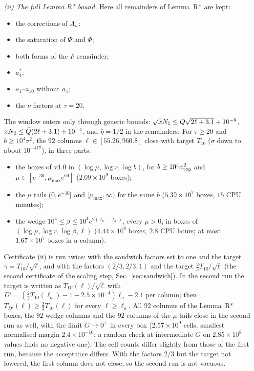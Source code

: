 \emph{(ii) The full Lemma R* bound.}
Here all remainders of Lemma~R* are kept:
\begin{itemize}
\item the corrections of $A_w$;
\item the saturation of $\Psi$ and $\Phi$;
\item both forms of the $F$ remainder;
\item $a_4^*$;
\item $a_1$--$a_{10}$ without $a_4$;
\item the $\nu$ factors at $\tau=20$.
\end{itemize}
The window enters only through generic bounds: $\sqrt xN_1\le\bar Q\sqrt{2\ell+3.1}+10^{-6}$, $xN_2\le\bar Q(2\ell+3.1)+10^{-4}$, and $\bar\eta=1/2$ in the remainders.
For $\tau\ge20$ and $b\ge10^4\sigma^2$, the $92$ columns $\ell\in[55.26,960.8]$ close with target $T_{10}$ ($\sigma$ down to about $10^{-417}$), in three parts:
\begin{itemize}
\item the boxes of v1.0 in $(\log\mu,\log r,\log b)$, for $b\ge10^4\sigma_{\rm top}^2$ and $\mu\in[e^{-30},\mu_{\max}e^{60}]$ ($2.09\times10^{9}$ boxes);
\item the $\mu$ tails $(0,e^{-30}]$ and $[\mu_{\max},\infty)$ for the same $b$ ($5.39\times10^{7}$ boxes, $15$ CPU minutes);
\item the wedge $10^4\le\beta\le10^4e^{2(\ell_b-\ell_a)}$, every $\mu>0$, in boxes of $(\log\mu,\log r,\log\beta,\ell)$ ($4.44\times10^{8}$ boxes, $2.8$ CPU hours; at most $1.67\times10^{7}$ boxes in a column).
\end{itemize}
Certificate (ii) is run twice: with the sandwich factors set to one and the target $\gamma=T_{10}/\sqrt\ell$, and with the factors $(2/3,2/3,1)$ and the target $\frac23T_{10}/\sqrt\ell$ (the second certificate of the scaling step, Sec.~\ref{sec:sandwich}).
In the second run the target is written as $T_{D'}(\ell)/\sqrt\ell$ with $D'=(\frac23T_{10}(\ell_a)-1-2.5\times10^{-4})\ell_a-2.1$ per column; then $T_{D'}(\ell)\ge\frac23T_{10}(\ell)$ for every $\ell\ge\ell_a$.
All $92$ columns of the Lemma~R* boxes, the $92$ wedge columns and the $92$ columns of the $\mu$ tails close in the second run as well, with the limit $G\to0^+$ in every box ($2.57\times10^{9}$ cells; smallest normalised margin $2.4\times10^{-10}$; a random check at intermediate $G$ on $2.85\times10^{8}$ values finds no negative one).
The cell counts differ slightly from those of the first run, because the acceptance differs.
With the factors $2/3$ but the target not lowered, the first column does not close, so the second run is not vacuous.

